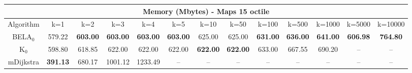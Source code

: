\begin{tabular}{c|cccccccccccc}\toprule
\multicolumn{13}{c}{Memory (Mbytes) - Maps 15 octile}\\ \midrule
Algorithm & k=1 & k=2 & k=3 & k=4 & k=5 & k=10 & k=50 & k=100 & k=500 & k=1000 & k=5000 & k=10000 \\ \midrule
BELA$_0$ & 579.22 & \textbf{603.00} & \textbf{603.00} & \textbf{603.00} & \textbf{603.00} & 625.00 & 625.00 & \textbf{631.00} & \textbf{636.00} & \textbf{641.00} & \textbf{606.98} & \textbf{764.80} \\
K$_0$ & 598.80 & 618.85 & 622.00 & 622.00 & 622.00 & \textbf{622.00} & \textbf{622.00} & 633.00 & 667.55 & 690.20 & -- & -- \\
mDijkstra & \textbf{391.13} & 680.17 & 1001.12 & 1233.49 & -- & -- & -- & -- & -- & -- & -- & -- \\ \bottomrule 
\end{tabular}

